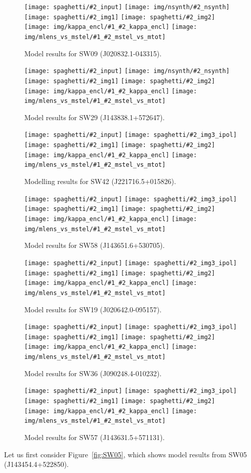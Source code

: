 \documentclass[fleqn,usenatbib]{mnras}
\newcommand{\inclfig}[2]{
  \centering
	\texttt{[image: spaghetti/\#2\_input]}%
	\texttt{[image: spaghetti/\#2\_img3\_ipol]}
	\texttt{[image: spaghetti/\#2\_img1]}%
	\texttt{[image: spaghetti/\#2\_img2]}
	\texttt{[image: img/kappa\_encl/\#1\_\#2\_kappa\_encl]}%
	\texttt{[image: img/mlens\_vs\_mstel/\#1\_\#2\_mstel\_vs\_mtot]}
}
\newcommand{\inclfign}[2]{
  \centering
	\texttt{[image: spaghetti/\#2\_input]}%
	\texttt{[image: img/nsynth/\#2\_nsynth]}
	\texttt{[image: spaghetti/\#2\_img1]}%
	\texttt{[image: spaghetti/\#2\_img2]}
	\texttt{[image: img/kappa\_encl/\#1\_\#2\_kappa\_encl]}%
	\texttt{[image: img/mlens\_vs\_mstel/\#1\_\#2\_mstel\_vs\_mtot]}
}
\newcommand{\figref}[1]{\ref{fig:#1}}
\begin{document}
\begin{figure}
  \inclfign{SW09}{ASW0002asp_5EKMWWVJHL}
  \caption{Model results for SW09 (J020832.1-043315).}
  \label{fig:SW09}
\end{figure}

\begin{figure}
  \inclfign{SW29}{ASW0008qsm_TOFS7JNGEK}
  \caption{Model results for SW29 (J143838.1+572647).}
  \label{fig:SW29}
\end{figure}

\begin{figure}
  \inclfig{SW42}{ASW00096rm_4Q3YCEWGLN}
  \caption{Modelling results for SW42 (J221716.5+015826).}
  \label{fig:SW42}
\end{figure}

\begin{figure}
  \inclfig{SW58}{ASW0007iwp_4XBJWT3COV}
  \caption{Model results for SW58 (J143651.6+530705).}
  \label{fig:SW58}
\end{figure}

\begin{figure}
  \inclfig{SW19}{ASW0001ld7_OS3CYAKLRT}
  \caption{Model results for SW19 (J020642.0-095157).}
  \label{fig:SW19}
\end{figure}


\begin{figure}
  \inclfig{SW36}{ASW000096t_7IPP7LWVOF}
  \caption{Model results for SW36 (J090248.4-010232).}
  \label{fig:SW36}
\end{figure}

\begin{figure}
  \inclfig{SW57}{ASW0008pag_5SXGXQYY6V}
  \caption{Model results for SW57 (J143631.5+571131).}
  \label{fig:SW57}
\end{figure}

Let us first consider Figure~\figref{SW05}, which shows model results
from SW05 (J143454.4+522850).
\end{document}
